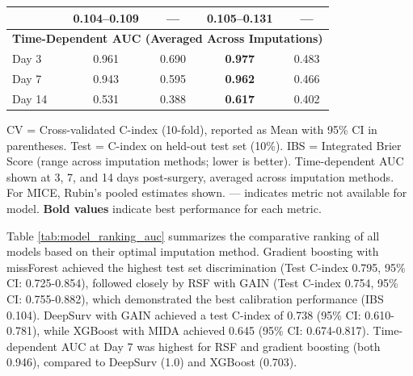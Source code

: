 \documentclass[pdflatex,sn-mathphys-num]{sn-jnl}%
\theoremstyle{thmstyleone}%
\theoremstyle{thmstyletwo}%
\theoremstyle{thmstylethree}%
\begin{document}
\begin{table}[!ht]
\begin{minipage}{\textwidth}
{\begin{tabular}{@{}lcccccccc@{}}
\midrule
  & \multicolumn{2}{c}{\textbf{0.104}--0.109} & \multicolumn{2}{c}{—} & \multicolumn{2}{c}{0.105--0.131} & \multicolumn{2}{c}{—} \\
\midrule
\multicolumn{9}{l}{\textbf{Time-Dependent AUC (Averaged Across Imputations)}} \\
\midrule
Day 3 & \multicolumn{2}{c}{0.961} & \multicolumn{2}{c}{0.690} & \multicolumn{2}{c}{\textbf{0.977}} & \multicolumn{2}{c}{0.483} \\
Day 7 & \multicolumn{2}{c}{0.943} & \multicolumn{2}{c}{0.595} & \multicolumn{2}{c}{\textbf{0.962}} & \multicolumn{2}{c}{0.466} \\
Day 14 & \multicolumn{2}{c}{0.531} & \multicolumn{2}{c}{0.388} & \multicolumn{2}{c}{\textbf{0.617}} & \multicolumn{2}{c}{0.402} \\
\bottomrule
\end{tabular}
}
\par\medskip
\tiny
CV = Cross-validated C-index (10-fold), reported as Mean with 95\% CI in parentheses. Test = C-index on held-out test set (10\%). IBS = Integrated Brier Score (range across imputation methods; lower is better). Time-dependent AUC shown at 3, 7, and 14 days post-surgery, averaged across imputation methods. For MICE, Rubin's pooled estimates shown. — indicates metric not available for model. \textbf{Bold values} indicate best performance for each metric.
\end{minipage}
\end{table}

Table \ref{tab:model_ranking_auc} summarizes the comparative ranking of all models based on their optimal imputation method. Gradient boosting with missForest achieved the highest test set discrimination (Test C-index 0.795, 95\% CI: 0.725-0.854), followed closely by RSF with GAIN (Test C-index 0.754, 95\% CI: 0.755-0.882), which demonstrated the best calibration performance (IBS 0.104). DeepSurv with GAIN achieved a test C-index of 0.738 (95\% CI: 0.610-0.781), while XGBoost with MIDA achieved 0.645 (95\% CI: 0.674-0.817). Time-dependent AUC at Day 7 was highest for RSF and gradient boosting (both 0.946), compared to DeepSurv (1.0) and XGBoost (0.703).
\end{document}
